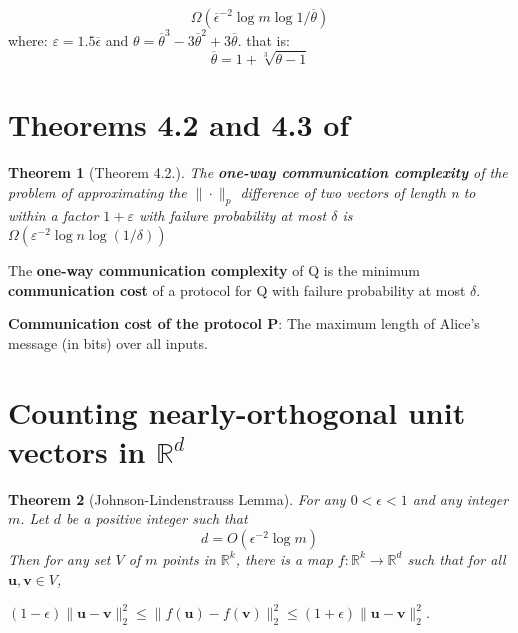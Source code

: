 \documentclass[twoside,11pt]{article}
\newtheorem{theorem}{Theorem}
\def\vec#1{\mathbf{#1}}
\def\R{\mathbb{R}}
\def\mysecondinsert#1{#1}
\begin{document}
$$\Omega(\overline{\epsilon}^{-2}\log m \log 1/\overline{\theta})$$
where:
$\varepsilon\mysecondinsert{=1.5\overline{\epsilon}}$ and $\theta=\overline{\theta}^3 - 3 \overline{\theta}^2 + 3 \overline{\theta}$. 
that is:
$$
\overline{\theta} = 1 + \sqrt[3]{\theta - 1}
$$





\section{Theorems 4.2 and 4.3 of \cite{Jayram:2011:OBJ:2133036.2133037}}



\begin{theorem}[Theorem 4.2.] The \textbf{one-way communication complexity}
of the problem of approximating the $\|\cdot\|_p$ difference
of two vectors of length n to within a factor $1 + \varepsilon$ with
failure probability at most $\delta$ is $\Omega(\varepsilon^{-2}\log n \log (1/\delta))$
\end{theorem}


The \textbf{one-way communication complexity} of Q is the minimum \textbf{communication
cost} of a protocol for Q with failure probability at
most $\delta$.

\textbf{Communication cost of the protocol P}: The maximum length
of Alice's message (in bits) over all inputs.


\section{Counting nearly-orthogonal unit vectors in $\R^d$}
\label{sec:_demonstration_}
\begin{theorem}[Johnson-Lindenstrauss Lemma]
\label{th:JJL} For any $0 < \epsilon < 1$ and any integer $m$. Let $d$ be a positive integer such that
$$d=O(\epsilon^{-2}\log{m})$$
Then for any set $V$ of $m$ points in ${\mathbb R}^k$, there is a map $f : {\mathbb R}^k \rightarrow {\mathbb R}^d$ such that for all $\vec{u}, \vec{v} \in V$, 
\begin{center}
$(1- \epsilon) \|\vec{u}-\vec{v}\|^2_2 \leq \|f(\vec{u})-f(\vec{v})\|^2_2 \leq  (1 + \epsilon)\|\vec{u}-\vec{v}\|^2_2 $.
\end{center}
\end{theorem}
\end{document}
